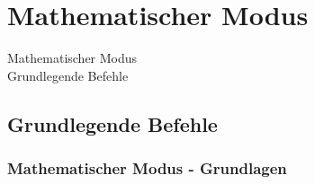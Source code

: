 \documentclass{beamer}
\begin{document}
 \section{Mathematischer Modus}
 \begin{frame}
  \begin{center}
   \Huge Mathematischer Modus \\
   \Large Grundlegende Befehle
  \end{center}
 \end{frame}
 
 \subsection{Grundlegende Befehle}
  \begin{frame}[fragile]
   \frametitle{Mathematischer Modus - Grundlagen}
  	\begin{semiverbatim}
  	\end{semiverbatim}
  	\begin{semiverbatim}
  	\end{semiverbatim}
  	\begin{semiverbatim}
  	\end{semiverbatim}
  	\begin{semiverbatim}
  	\end{semiverbatim}
  \end{frame}
 
\end{document}
